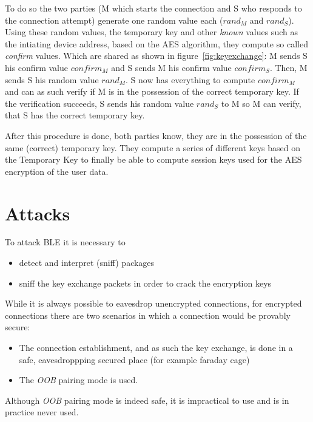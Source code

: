 \documentclass[conference]{IEEEtran}
\begin{document}
To do so the two parties (M which starts the connection and S who responds to 
the connection attempt) generate one random value each ($rand_M$ and $rand_S$). 
Using these random values, the temporary key and other \emph{known} values such 
as the intiating device address, based on the AES algorithm, they compute so 
called \emph{confirm} values. Which are shared as shown in 
figure~\ref{fig:keyexchange}: M sends S his confirm value $confirm_M$ and S 
sends M his confirm value $confirm_S$. Then, M sends S his random value 
$rand_M$. S now has everything to compute $confirm_M$ and can as such verify if 
M is in the possession of the correct temporary key. If the verification 
succeeds, S sends his random value $rand_S$ to M so M can verify, that S has 
the correct temporary key.


After this procedure is done, both parties know, they are in the possession of the same (correct) temporary key. They compute a series of different keys based on the Temporary Key to finally be able to compute session keys used for the AES encryption of the user data.

\section{Attacks}
\label{attacks}

To attack BLE it is necessary to
\begin{itemize}
  \item detect and interpret (sniff) packages
  \item sniff the key exchange packets in order to crack the encryption keys
\end{itemize}

While it is always possible to eavesdrop unencrypted connections, for encrypted connections there are two scenarios in which a connection would be provably secure:
\begin{itemize}
  \item The connection establishment, and as such the key exchange, is done in a safe, eavesdroppping secured place (for example faraday cage)
  \item The \emph{OOB} pairing mode is used.
\end{itemize}

Although \emph{OOB} pairing mode is indeed safe, it is impractical to use and is in practice never used.
\end{document}

